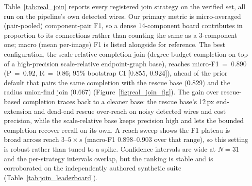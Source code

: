 \documentclass{ieeeaccess}
\begin{document}
Table~\ref{tab:real_join} reports every registered join strategy on the verified set, all run on the pipeline's own detected wires. Our primary metric is micro-averaged (pair-pooled) component-pair F1, so a dense 14-component board contributes in proportion to its connections rather than counting the same as a 3-component one; macro (mean per-image) F1 is listed alongside for reference. The best configuration, the scale-relative completion join (degree-budget completion on top of a high-precision scale-relative endpoint-graph base), reaches micro-F1~=~0.890 (P~=~0.92, R~=~0.86; 95\% bootstrap CI [0.855, 0.924]), ahead of the prior default that pairs the same completion with the rescue base (0.829) and the radius union-find join (0.667) (Figure~\ref{fig:real_join_fig}). The gain over rescue-based completion traces back to a cleaner base: the rescue base's 12\,px end-extension and dead-end rescue over-reach on noisy detected wires and cost precision, while the scale-relative base keeps precision high and lets the bounded completion recover recall on its own. A reach sweep shows the F1 plateau is broad across reach $3$--$5\times s$ (macro-F1 0.898--0.903 over that range), so this setting is robust rather than tuned to a spike. Confidence intervals are wide at $N=31$ and the per-strategy intervals overlap, but the ranking is stable and is corroborated on the independently authored synthetic suite (Table~\ref{tab:join_leaderboard}).
\end{document}
